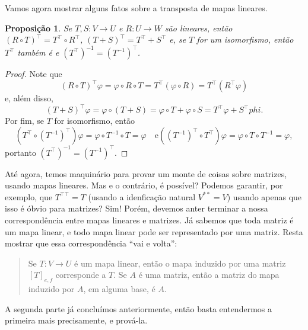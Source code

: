 \documentclass{article}
\newtheorem{proposition}[definition]{Proposição}
\renewcommand{\phi}{\varphi}
\begin{document}
Vamos agora mostrar alguns fatos sobre a transposta de mapas lineares.

\begin{proposition}
    Se $T,S \colon V \to U$ e $R \colon U \to W$ são lineares, então $(R \circ T)^\top = T^\top \circ R^\top$, $(T + S)^\top = T^\top + S^\top$ e, se $T$ for um isomorfismo, então $T^\top$ também é e $(T^\top)^{-1} = (T^{-1})^\top$.
\end{proposition}
\begin{proof}
    Note que \begin{equation}
        (R \circ T)^\top\phi = \phi \circ R \circ T = T^\top(\phi \circ R) = T^\top(R^\top \phi)
    \end{equation} e, além disso, \begin{equation}
        (T + S)^\top\phi = \phi \circ (T + S) = \phi \circ T + \phi \circ S = T^\top \phi + S^\top phi.
    \end{equation} Por fim, se $T$ for isomorfismo, então \begin{equation}
        (T^\top \circ (T^{-1})^\top)\phi = \phi \circ T^{-1} \circ T = \phi \quad \text{e} ((T^{-1})^\top \circ T^\top)\phi = \phi \circ T \circ T^{-1} = \phi,
    \end{equation} portanto $(T^\top)^{-1} = (T^{-1})^\top$.
\end{proof}

Até agora, temos maquinário para provar um monte de coisas sobre matrizes, usando mapas lineares. Mas e o contrário, é possível? Podemos garantir, por exemplo, que $T^{\top\top} = T$ (usando a idenficação natural $V^{**} = V$) usando apenas que isso é óbvio para matrizes? Sim! Porém, devemos anter terminar a nossa correspondência entre mapas lineares e matrizes. Já sabemos que toda matriz é um mapa linear, e todo mapa linear pode ser representado por uma matriz. Resta mostrar que essa correspondência ``vai e volta'': \begin{quotation}
    Se $T \colon V \to U$ é um mapa linear, então o mapa induzido por uma matriz $[T]_{e,f}$ corresponde a $T$. Se $A$ é uma matriz, então a matriz do mapa induzido por $A$, em alguma base, é $A$.
\end{quotation}
A segunda parte já concluímos anteriormente, então basta entendermos a primeira mais precisamente, e prová-la.
\end{document}
